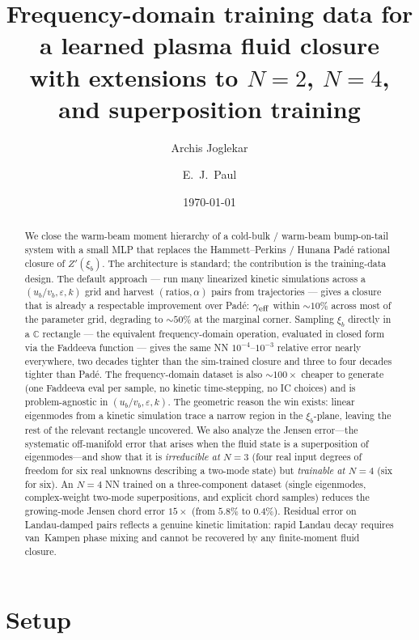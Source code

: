 \documentclass[11pt]{article}
\title{Frequency-domain training data for a learned plasma fluid closure\\
\large with extensions to $N=2$, $N=4$, and superposition training}
\author{Archis Joglekar \and E.~J.~Paul}
\date{\today}
\newcommand{\xib}{\xi_b}
\newcommand{\ub}{u_b}
\newcommand{\vb}{v_b}
\begin{document}
\maketitle

\begin{abstract}
We close the warm-beam moment hierarchy of a cold-bulk / warm-beam
bump-on-tail system with a small MLP that replaces the Hammett--Perkins /
Hunana Pad\'e rational closure of $Z'(\xib)$. The architecture is standard;
the contribution is the training-data design. The default approach --- run
many linearized kinetic simulations across a $(\ub/\vb, \varepsilon, k)$
grid and harvest $(\mathrm{ratios}, \alpha)$ pairs from trajectories ---
gives a closure that is already a respectable improvement over Pad\'e:
$\gamma_{\rm eff}$ within $\sim\!10\%$ across most of the parameter grid,
degrading to $\sim\!50\%$ at the marginal corner. Sampling $\xib$ directly
in a $\mathbb{C}$ rectangle --- the equivalent frequency-domain operation,
evaluated in closed form via the Faddeeva function --- gives the same NN
$10^{-4}$--$10^{-3}$ relative error nearly everywhere, two decades tighter
than the sim-trained closure and three to four decades tighter than Pad\'e.
The frequency-domain dataset is also $\sim\!100\times$ cheaper to
generate (one Faddeeva eval per sample, no kinetic time-stepping, no IC
choices) and is problem-agnostic in $(\ub/\vb, \varepsilon, k)$. The
geometric reason the win exists: linear eigenmodes from a kinetic
simulation trace a narrow region in the $\xib$-plane, leaving the rest of
the relevant rectangle uncovered.
We also analyze the Jensen error---the systematic off-manifold error that
arises when the fluid state is a superposition of eigenmodes---and show that
it is \emph{irreducible at $N=3$} (four real input degrees of freedom for six
real unknowns describing a two-mode state) but \emph{trainable at $N=4$}
(six for six).  An $N=4$ NN trained on a three-component dataset (single
eigenmodes, complex-weight two-mode superpositions, and explicit chord
samples) reduces the growing-mode Jensen chord error $15\times$ (from $5.8\%$
to $0.4\%$).  Residual error on Landau-damped pairs reflects a genuine
kinetic limitation: rapid Landau decay requires van~Kampen phase mixing and
cannot be recovered by any finite-moment fluid closure.
\end{abstract}

\section{Setup}
\end{document}
